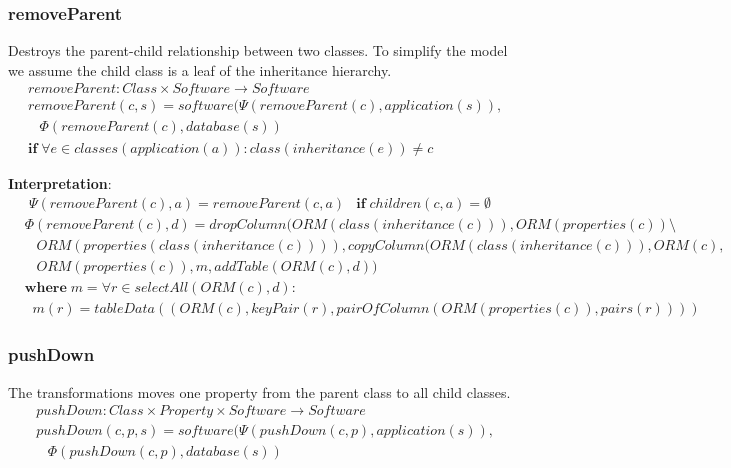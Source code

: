 \documentclass[10pt]{article}
\begin{document}
\subsubsection{removeParent}
Destroys the parent-child relationship between two classes. To simplify the model we assume the child class is a leaf of the inheritance hierarchy.
\begin{align}
& removeParent: Class \times Software \rightarrow Software \nonumber \\
& removeParent(c, s) = software(\Psi(removeParent(c), application(s)), \nonumber \\
& \;\;\;  \Phi(removeParent(c), database(s)) \nonumber \\
& \mathbf{if} \; \forall e \in classes(application(a)) : class(inheritance(e)) \neq c
\end{align}

\noindent \textbf{Interpretation}:
\begin{align}
\Psi(removeParent(c), a) = removeParent(c, a)
& \mathbf{if} \; children(c, a) = \emptyset
\end{align}
\begin{align}
&\Phi(removeParent(c), d) = 
 dropColumn(ORM(class(inheritance(c))), ORM(properties(c)) \setminus \nonumber \\ 
& \;\;\; ORM(properties(class(inheritance(c)))), copyColumn(ORM(class(inheritance(c))), ORM(c), \nonumber \\ 
& \;\;\; ORM(properties(c)), m, 
addTable(ORM(c), d)) \nonumber \\
& \mathbf{where} \; m = \forall r \in selectAll(ORM(c), d) : \nonumber \\  
& \;\; m(r) = tableData((ORM(c), keyPair(r), pairOfColumn(ORM(properties(c)), pairs(r))))  
\end{align}

\subsubsection{pushDown}
The transformations moves one property from the parent class to all child classes.
\begin{align}
& pushDown: Class \times Property \times Software \rightarrow Software \nonumber \\
& pushDown(c, p, s) = software(\Psi(pushDown(c, p), application(s)), \nonumber \\
& \;\;\; \Phi(pushDown(c, p), database(s))
\end{align}
\end{document}
